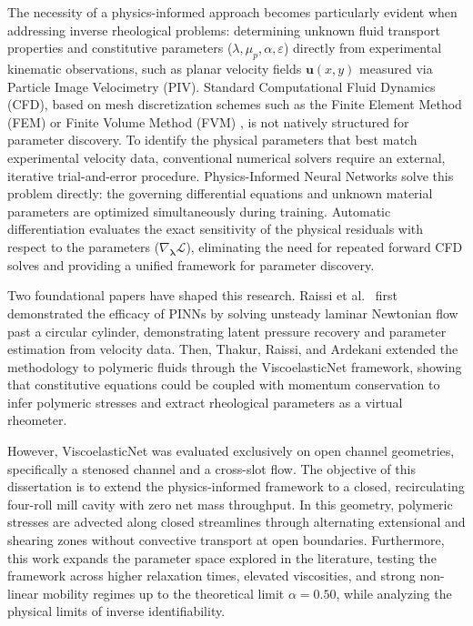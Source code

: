 The necessity of a physics-informed approach becomes particularly evident when
addressing inverse rheological problems: determining unknown fluid transport
properties and constitutive parameters ($\lambda, \mu_p, \alpha, \varepsilon$)
directly from experimental kinematic observations, such as planar velocity fields
$\boldsymbol{u}(x, y)$ measured via Particle Image Velocimetry (PIV). Standard
Computational Fluid Dynamics (CFD), based on mesh discretization schemes such as
the Finite Element Method (FEM) or Finite Volume Method (FVM) \cite{owens2002computational},
is not natively structured for parameter discovery. To identify the physical
parameters that best match experimental velocity data, conventional numerical
solvers require an external, iterative trial-and-error procedure. 
Physics-Informed Neural Networks solve this problem directly: the governing
differential equations and unknown material parameters are optimized
simultaneously during training. Automatic differentiation evaluates the exact
sensitivity of the physical residuals with respect to the parameters
($\nabla_{\boldsymbol{\lambda}} \mathcal{L}$), eliminating the need for repeated
forward CFD solves and providing a unified framework for parameter discovery.

Two foundational papers have shaped this research. Raissi et al.\
\cite{raissi2019physics} first demonstrated the efficacy of PINNs by solving
unsteady laminar Newtonian flow past a circular cylinder, demonstrating latent
pressure recovery and parameter estimation from velocity data. Then, Thakur,
Raissi, and Ardekani \cite{thakur2024viscoelasticnet} extended the methodology to
polymeric fluids through the ViscoelasticNet framework, showing that constitutive
equations could be coupled with momentum conservation to infer polymeric stresses
and extract rheological parameters as a virtual rheometer.

However, ViscoelasticNet was evaluated exclusively on open channel geometries,
specifically a stenosed channel and a cross-slot flow. The objective of this
dissertation is to extend the physics-informed framework to a closed,
recirculating four-roll mill cavity with zero net mass throughput. In this
geometry, polymeric stresses are advected along closed streamlines through
alternating extensional and shearing zones without convective transport at open
boundaries. Furthermore, this work expands the parameter space explored in the
literature, testing the framework across higher relaxation times, elevated
viscosities, and strong non-linear mobility regimes up to the theoretical limit
$\alpha = 0.50$, while analyzing the physical limits of inverse identifiability.

